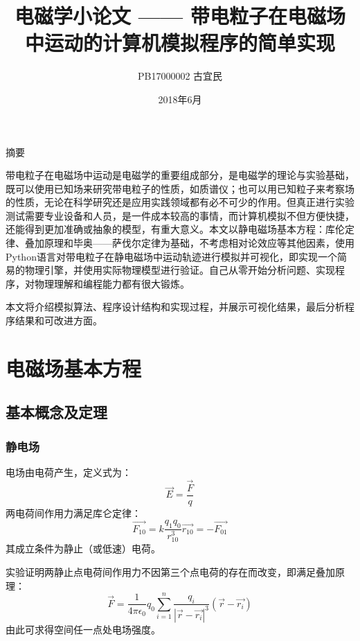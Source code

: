 \documentclass[UTF-8,cs4size]{ctexart}
\title{电磁学小论文 —— 带电粒子在电磁场中运动的计算机模拟程序的简单实现}
\author{PB17000002  古宜民}
\date{2018年6月}
\begin{document}
 \normalsize


\maketitle
\begin{center}
	摘要
\end{center}

带电粒子在电磁场中运动是电磁学的重要组成部分，是电磁学的理论与实验基础，既可以使用已知场来研究带电粒子的性质，如质谱仪；也可以用已知粒子来考察场的性质，无论在科学研究还是应用实践领域都有必不可少的作用。但真正进行实验测试需要专业设备和人员，是一件成本较高的事情，而计算机模拟不但方便快捷，还能得到更加准确或抽象的模型，有重大意义。本文以静电磁场基本方程：库伦定律、叠加原理和毕奥——萨伐尔定律为基础，不考虑相对论效应等其他因素，使用Python语言对带电粒子在静电磁场中运动轨迹进行模拟并可视化，即实现一个简易的物理引擎，并使用实际物理模型进行验证。自己从零开始分析问题、实现程序，对物理理解和编程能力都有很大锻炼。


本文将介绍模拟算法、程序设计结构和实现过程，并展示可视化结果，最后分析程序结果和可改进方面。
\clearpage
\section{电磁场基本方程}
\subsection{基本概念及定理}
\subsubsection{静电场}
电场由电荷产生，定义式为：
\begin{equation}
	\vec{E} = \frac{\vec{F}}{q}
\end{equation}
两电荷间作用力满足库仑定律：
\begin{equation}
	\vec{F_{10}} = k\frac{q_1q_0}{r_{10}^3}\vec{r_{10}} = - \vec{F_{01}}
\end{equation}
其成立条件为静止（或低速）电荷。


实验证明两静止点电荷间作用力不因第三个点电荷的存在而改变，即满足叠加原理：
\begin{equation}
	\vec{F} = \frac1{4\pi\epsilon_0}q_0\sum_{i=1}^{n} \frac{q_i}{|\vec{r} - \vec{r_i}|^3}(\vec{r} - \vec{r_i})
\end{equation}
由此可求得空间任一点处电场强度。
\end{document}

